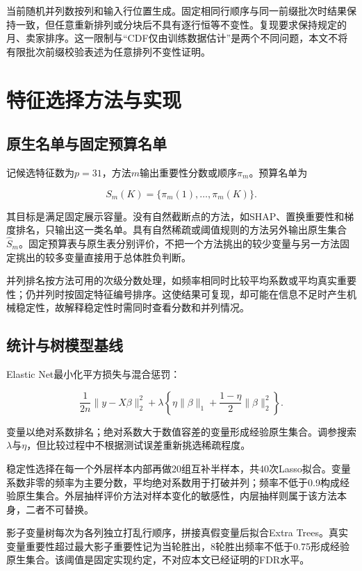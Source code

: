 \documentclass{sufethesismas}
\begin{document}
当前随机并列数按列和输入行位置生成。固定相同行顺序与同一前缀批次时结果保持一致，但任意重新排列或分块后不具有逐行恒等不变性。复现要求保持规定的月、卖家排序。这一限制与``CDF仅由训练数据估计''是两个不同问题，本文不将有限批次前缀校验表述为任意排列不变性证明。

\chapter{特征选择方法与实现}

\section{原生名单与固定预算名单}

记候选特征数为\(p=31\)，方法\(m\)输出重要性分数或顺序\(\pi_m\)。预算名单为

\[
S_m(K)=\{\pi_m(1),\ldots,\pi_m(K)\}.
\]

其目标是满足固定展示容量。没有自然截断点的方法，如SHAP、置换重要性和梯度排名，只输出这一类名单。具有自然稀疏或阈值规则的方法另外输出原生集合\(\widehat S_m\)。固定预算表与原生表分别评价，不把一个方法挑出的较少变量与另一方法固定挑出的较多变量直接用于总体胜负判断。

并列排名按方法可用的次级分数处理，如频率相同时比较平均系数或平均真实重要性；仍并列时按固定特征编号排序。这使结果可复现，却可能在信息不足时产生机械稳定性，故解释稳定性时需同时查看分数和并列情况。

\section{统计与树模型基线}

Elastic Net最小化平方损失与混合惩罚：

\[
\frac{1}{2n}\|y-X\beta\|_2^2+
\lambda\left\{\eta\|\beta\|_1+\frac{1-\eta}{2}\|\beta\|_2^2\right\}.
\]

变量以绝对系数排名；绝对系数大于数值容差的变量形成经验原生集合。调参搜索\(\lambda\)与\(\eta\)，但比较过程中不根据测试误差重新挑选稀疏程度。

稳定性选择在每一个外层样本内部再做20组互补半样本，共40次Lasso拟合。变量系数非零的频率为主要分数，平均绝对系数用于打破并列；频率不低于0.9构成经验原生集合。外层抽样评价方法对样本变化的敏感性，内层抽样则属于该方法本身，二者不可替换。

影子变量树每次为各列独立打乱行顺序，拼接真假变量后拟合Extra Trees。真实变量重要性超过最大影子重要性记为当轮胜出，8轮胜出频率不低于0.75形成经验原生集合。该阈值是固定实现约定，不对应本文已经证明的FDR水平。
\end{document}
